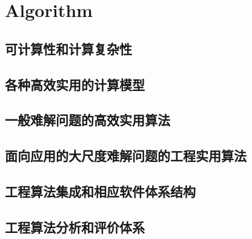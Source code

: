 

\chapter{Algorithm}

\section{可计算性和计算复杂性}
\section{各种高效实用的计算模型}
\section{一般难解问题的高效实用算法}
\section{面向应用的大尺度难解问题的工程实用算法}
\section{工程算法集成和相应软件体系结构}
\section{工程算法分析和评价体系}


